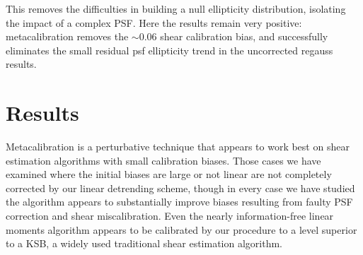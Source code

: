 \documentclass[iop]{emulateapj}
\begin{document}
This removes the difficulties in building a null ellipticity
distribution, isolating the impact of a complex PSF. Here the results
remain very positive: metacalibration removes the $\sim0.06$ shear
calibration bias, and successfully eliminates the small residual psf
ellipticity trend in the uncorrected regauss results.


\section{Results}
Metacalibration is a perturbative technique that appears to work best
on shear estimation algorithms with small calibration biases. Those
cases we have examined where the initial biases are large or not
linear are not completely corrected by our linear detrending scheme,
though in every case we have studied the algorithm appears to
substantially improve biases resulting from faulty PSF correction and
shear miscalibration. Even the nearly information-free linear moments
algorithm appears to be calibrated by our procedure to a level
superior to a KSB, a widely used traditional shear estimation algorithm.
\end{document}
